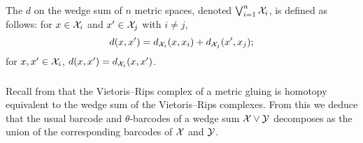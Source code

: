 The  $d$ on the wedge sum of $n$ metric spaces, denoted $\bigvee_{i=1}^n \mathcal{X}_i$, is defined as follows: for $x \in \mathcal{X}_i$ and $x' \in \mathcal{X}_j$ with $i \neq j$,
\[
d(x, x') = d_{\mathcal{X}_i}(x, x_i) + d_{\mathcal{X}_j}(x', x_j);
\]
for $x, x' \in \mathcal{X}_i$, $d(x, x') = d_{\mathcal{X}_i}(x, x')$.


\subsubsection{}\label{prop:wedge sum}
Recall from \cite[Proposition 1 \& Corollary 2]{adamaszek2020homotopy} that the Vietoris--Rips complex of a metric gluing is homotopy equivalent to the wedge sum of the Vietoris--Rips complexes.
From this we deduce that the usual barcode and $\theta$-barcodes of a wedge sum $\mathcal{X} \vee \mathcal{Y}$ decomposes as the union of the corresponding barcodes of $\mathcal{X}$ and $\mathcal{Y}$.


%	

